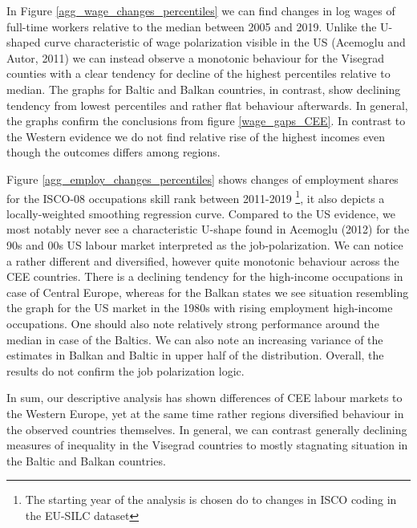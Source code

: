 \documentclass{article}
\begin{document}
In Figure \ref{agg_wage_changes_percentiles} we can find changes in log wages of full-time workers relative to the median between 2005 and 2019. Unlike the U-shaped curve characteristic of wage polarization visible in the US (Acemoglu and Autor, 2011) we can instead observe a monotonic behaviour for the Visegrad counties with a clear tendency for decline of the highest percentiles relative to median. The graphs for Baltic and Balkan countries, in contrast, show declining tendency from lowest percentiles and rather flat behaviour afterwards. In general, the graphs confirm the conclusions from figure \ref{wage_gaps_CEE}. In contrast to the Western evidence we do not find relative rise of the highest incomes even though the outcomes differs among regions.

Figure \ref{agg_employ_changes_percentiles} shows changes of employment shares for the ISCO-08 occupations skill rank between 2011-2019 \footnote{The starting year of the analysis is chosen do to changes in ISCO coding in the EU-SILC dataset}, it also depicts a locally-weighted smoothing regression curve. Compared to the US evidence, we most notably never see a characteristic U-shape found in Acemoglu (2012) for the 90s and 00s US labour market interpreted as the job-polarization. We can notice a rather different and diversified, however quite monotonic behaviour across the CEE countries. There is a declining tendency for the high-income occupations in case of Central Europe, whereas for the Balkan states we see situation resembling the graph for the US market in the 1980s with rising employment high-income occupations. One should also note relatively strong performance around the median in case of the Baltics. We can also note an increasing variance of the estimates in Balkan and Baltic in upper half of the distribution. Overall, the results do not confirm the job polarization logic.

In sum, our descriptive analysis has shown differences of CEE labour markets to the Western Europe, yet at the same time rather regions diversified behaviour in the observed countries themselves. In general, we can contrast generally declining measures of inequality in the Visegrad countries to mostly stagnating situation in the Baltic and Balkan countries.
\end{document}

